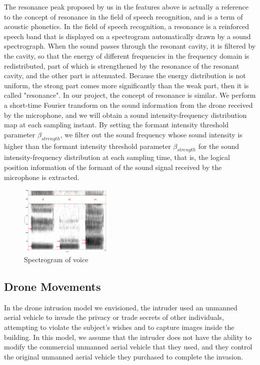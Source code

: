 \documentclass{sig-alternate-10pt}
\begin{document}
The resonance peak proposed by us in the features above is actually a reference to the concept of resonance in the field of speech recognition, and is a term of acoustic phonetics. In the field of speech recognition, a resonance is a reinforced speech band that is displayed on a spectrogram automatically drawn by a sound spectrograph. When the sound passes through the resonant cavity, it is filtered by the cavity, so that the energy of different frequencies in the frequency domain is redistributed, part of which is strengthened by the resonance of the resonant cavity, and the other part is attenuated. Because the energy distribution is not uniform, the strong part comes more significantly than the weak part, then it is called "resonance". In our project, the concept of resonance is similar. We perform a short-time Fourier transform on the sound information from the drone received by the microphone, and we will obtain a sound intensity-frequency distribution map at each sampling instant. By setting the formant intensity threshold parameter $\beta_{strength}$, we filter out the sound frequency whose sound intensity is higher than the formant intensity threshold parameter $\beta_{strength}$ for the sound intensity-frequency distribution at each sampling time, that is, the logical position information of the formant of the sound signal received by the microphone is extracted. 

\begin{figure}[!h]
	\centering
	\includegraphics[width=0.4\textwidth]{pics/spectrogram.png}
	\caption{Spectrogram of voice}
	\label{spec}
\end{figure}


\subsection{Drone Movements}
In the drone intrusion model we envisioned, the intruder used an unmanned aerial vehicle to invade the privacy or trade secrets of other individuals, attempting to violate the subject's wishes and to capture images inside the building. In this model, we assume that the intruder does not have the ability to modify the commercial unmanned aerial vehicle that they used, and they control the original unmanned aerial vehicle they purchased to complete the invasion.
\end{document}
